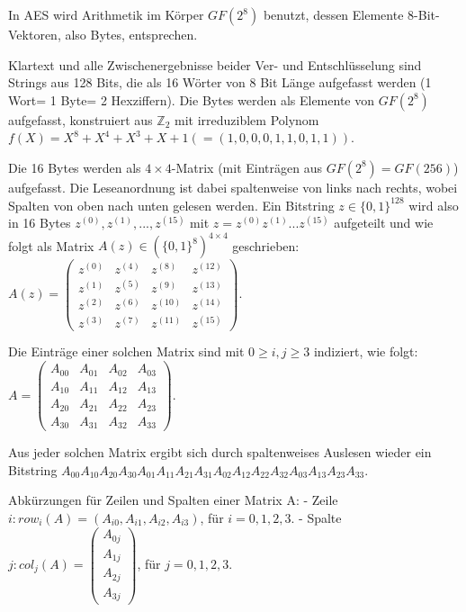 \documentclass[a4paper]{article}
\begin{document}
\begin{multicols}{3}
In AES wird Arithmetik im Körper $GF(2^8)$ benutzt, dessen Elemente $8$-Bit-Vektoren, also Bytes, entsprechen.

Klartext und alle Zwischenergebnisse beider Ver- und Entschlüsselung sind Strings aus 128 Bits, die als 16 Wörter von 8 Bit Länge aufgefasst werden (1 Wort= 1 Byte= 2 Hexziffern). Die Bytes werden als Elemente von $GF(2^8)$ aufgefasst, konstruiert aus $\mathbb{Z}_2$ mit irreduziblem Polynom $f(X) =X^8 +X^4 +X^3 +X+ 1 (= (1, 0 , 0 , 0 , 1 , 1 , 0 , 1 ,1) )$.

Die 16 Bytes werden als $4\times 4$-Matrix (mit Einträgen aus $GF(2^8)=GF(256)$) aufgefasst. Die Leseanordnung ist dabei spaltenweise von links nach rechts, wobei Spalten von oben nach unten gelesen werden. Ein Bitstring $z\in\{0,1\}^{128}$ wird also in 16 Bytes $z^{(0)},z^{(1)},...,z^{(15)}$ mit $z=z^{(0)}z^{(1)}...z^{(15)}$ aufgeteilt und wie folgt als Matrix $A(z)\in(\{0,1\}^8)^{4\times 4}$ geschrieben: $A(z) =\begin{pmatrix} z^{(0)}& z^{(4)}& z^{(8)}& z^{(12)} \\ z^{(1)}& z^{(5)}& z^{(9)}& z^{(13)} \\ z^{(2)}& z^{(6)}& z^{(10)}& z^{(14)} \\ z^{(3)}& z^{(7)}& z^{(11)}& z^{(15)} \end{pmatrix}$.

Die Einträge einer solchen Matrix sind mit $0\geq i,j\geq 3$ indiziert, wie folgt: $A=\begin{pmatrix} A_{00}& A_{01}& A_{02}& A_{03}\\ A_{10}& A_{11}& A_{12}& A_{13}\\ A_{20}& A_{21}& A_{22}& A_{23}\\ A_{30}& A_{31}& A_{32}& A_{33}\end{pmatrix}$.

Aus jeder solchen Matrix ergibt sich durch spaltenweises Auslesen wieder ein Bitstring $A_{00} A_{10} A_{20} A_{30} A_{01} A_{11} A_{21} A_{31} A_{02} A_{12} A_{22} A_{32} A_{03} A_{13} A_{23} A_{33}$.

Abkürzungen für Zeilen und Spalten einer Matrix A: 
- Zeile $i: row_i(A)=(A_{i0},A_{i1},A_{i2} ,A_{i3})$, für $i=0,1,2,3$.
- Spalte $j:col_j(A)=\begin{pmatrix} A_{0j}\\ A_{1j}\\ A_{2j}\\ A_{3j} \end{pmatrix}$, für $j=0,1,2,3$.


\end{multicols}
\end{document}
